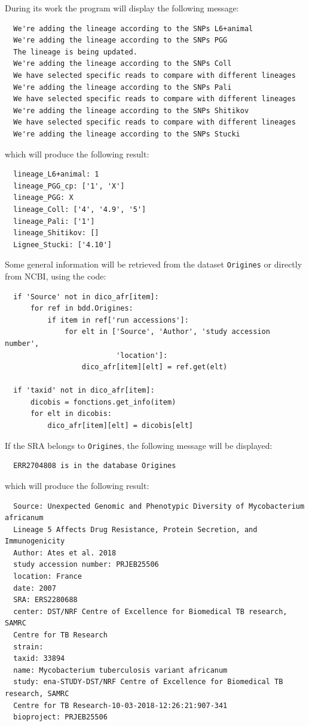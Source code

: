 \documentclass[twoside,a4paper,11pt,frenchb,openany]{report}
\begin{document}
    During its work the program will display the following message:

    \begin{verbatim}
  We're adding the lineage according to the SNPs L6+animal
  We're adding the lineage according to the SNPs PGG
  The lineage is being updated.
  We're adding the lineage according to the SNPs Coll
  We have selected specific reads to compare with different lineages
  We're adding the lineage according to the SNPs Pali
  We have selected specific reads to compare with different lineages
  We're adding the lineage according to the SNPs Shitikov
  We have selected specific reads to compare with different lineages
  We're adding the lineage according to the SNPs Stucki
\end{verbatim}

    which will produce the following result:

    \begin{verbatim}
  lineage_L6+animal: 1
  lineage_PGG_cp: ['1', 'X']
  lineage_PGG: X
  lineage_Coll: ['4', '4.9', '5']
  lineage_Pali: ['1']
  lineage_Shitikov: []
  Lignee_Stucki: ['4.10']
\end{verbatim}

    Some general information will be retrieved from the dataset \texttt{Origines} or
directly from NCBI, using the code:

\begin{verbatim}
  if 'Source' not in dico_afr[item]:
      for ref in bdd.Origines:
          if item in ref['run accessions']:
              for elt in ['Source', 'Author', 'study accession number',
                          'location']:
                  dico_afr[item][elt] = ref.get(elt)

  if 'taxid' not in dico_afr[item]:
      dicobis = fonctions.get_info(item)
      for elt in dicobis:
          dico_afr[item][elt] = dicobis[elt]
\end{verbatim}

    If the SRA belongs to \texttt{Origines}, the following message will be displayed:

    \begin{verbatim}
  ERR2704808 is in the database Origines
\end{verbatim}

    which will produce the following result:

    \begin{verbatim}
  Source: Unexpected Genomic and Phenotypic Diversity of Mycobacterium africanum   
  Lineage 5 Affects Drug Resistance, Protein Secretion, and Immunogenicity
  Author: Ates et al. 2018
  study accession number: PRJEB25506
  location: France
  date: 2007
  SRA: ERS2280688
  center: DST/NRF Centre of Excellence for Biomedical TB research, SAMRC 
  Centre for TB Research
  strain: 
  taxid: 33894
  name: Mycobacterium tuberculosis variant africanum
  study: ena-STUDY-DST/NRF Centre of Excellence for Biomedical TB research, SAMRC 
  Centre for TB Research-10-03-2018-12:26:21:907-341
  bioproject: PRJEB25506
\end{verbatim}
\end{document}
